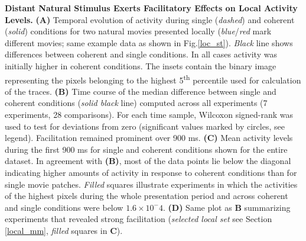 \textbf{Distant Natural Stimulus Exerts Facilitatory Effects on Local
Activity Levels.} \textbf{(A)} Temporal evolution of activity during single
(\textit{dashed}) and coherent (\textit{solid}) conditions for two natural
movies presented locally (\textit{blue}/\textit{red} mark different movies;
same example data as shown in Fig.\ref{loc_st}). \textit{Black} line shows
differences between coherent and single conditions. In all cases activity
was initially higher in coherent conditions. The insets contain the binary
image representing the pixels belonging to the highest
5\textsuperscript{th} percentile used for calculation of the traces.
\textbf{(B)} Time course of the median difference between single and
coherent conditions (\textit{solid black} line) computed across all
experiments (7 experiments, 28 comparisons). For each time sample, Wilcoxon
signed-rank was used to test for deviations from zero (significant values
marked by circles, see legend). Facilitation remained prominent over 900
ms. \textbf{(C)} Mean activity levels during the first 900 ms for single
and coherent conditions shown for the entire dataset. In agreement with
\textbf{(B)}, most of the data points lie below the diagonal indicating
higher amounts of activity in response to coherent conditions than for
single movie patches. \textit{Filled} squares illustrate experiments in
which the activities of the highest pixels during the whole presentation
period and across coherent and single conditions were below $1.6 \times
10^-4$. \textbf{(D)} Same plot as \textbf{B} summarizing experiments that
revealed strong facilitation (\textit{selected local set} see Section
\ref{local_mm}, \textit{filled} squares in \textbf{C}).
